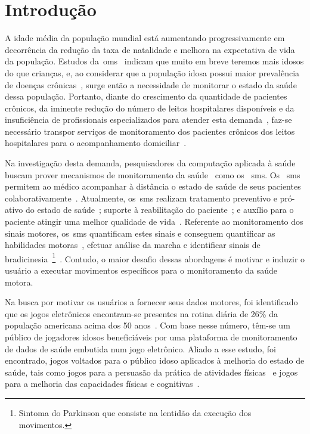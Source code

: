 \chapter{Introdu\c{c}\~{a}o} \label{chapter:intro}

A idade média da população mundial está aumentando progressivamente em decorrência da redução da taxa de natalidade e melhora na expectativa de vida da população. Estudos da~\ac{oms}~\cite{ageing2011} indicam que muito em breve teremos mais idosos do que crianças, e, ao considerar que a população idosa possui maior prevalência de doenças crônicas~\cite{prevcronica2009}, surge então a necessidade de monitorar o estado da saúde dessa população. Portanto, diante do crescimento da quantidade de pacientes crônicos, da iminente redução do número de leitos hospitalares disponíveis e da insuficiência de profissionais especializados para atender esta demanda~\cite{healthmonitoring2013}, faz-se necessário transpor serviços de monitoramento dos pacientes crônicos dos leitos hospitalares para o acompanhamento domiciliar~\cite{homecarebrazil2011}. 

Na investigação desta demanda, pesquisadores da computação aplicada à saúde buscam prover mecanismos de monitoramento da saúde~\cite{healthmonitoring2013,bardram2010,aarhus_negotiating_2010} como os ~\ac{sms}. Os ~\ac{sms} permitem ao médico acompanhar à distância o estado de saúde de seus pacientes colaborativamente~\cite{healthmonitoring2013}. Atualmente, os~\ac{sms} realizam tratamento preventivo e pró-ativo do estado de saúde~\cite{bardram2010}; suporte à reabilitação do paciente~\cite{sacbespoke2014}; e auxílio para o paciente atingir uma melhor qualidade de vida~\cite{sacsvmhms2014}. Referente ao monitoramento dos sinais motores, os~\ac{sms} quantificam estes sinais e conseguem quantificar as habilidades motoras~\cite{manumeterjbhi2014,patel_monitoring_2009}, efetuar análise da marcha \cite{robotgait2014} e identificar sinais de bradicinesia~\footnote{Sintoma do Parkinson que consiste na lentidão da execução dos movimentos.}~\cite{ambulatoryparkinson2010}. Contudo, o maior desafio dessas abordagens é motivar e induzir o usuário a executar movimentos específicos para o monitoramento da saúde motora.

Na busca por motivar os usuários a fornecer seus dados motores, foi identificado que os jogos eletrônicos encontram-se presentes na rotina diária de 26\% da população americana acima dos 50 anos~\cite{esa2016}. Com base nesse número, têm-se um público de jogadores idosos beneficiáveis por uma plataforma de monitoramento de dados de saúde embutida num jogo eletrônico. Aliado a esse estudo, foi encontrado, jogos voltados para o público idoso aplicados à melhoria do estado de saúde, tais como jogos para a persuasão da prática de atividades físicas~\cite{brox11} e jogos para a melhoria das capacidades físicas e cognitivas~\cite{arntzen2011}. 

